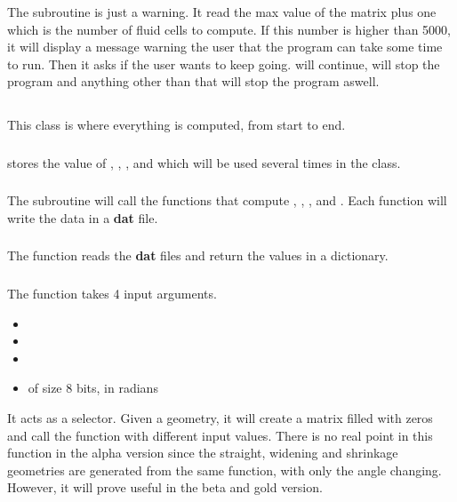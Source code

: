 \subsubsection{\textcolor{func}{}}
The subroutine \textcolor{func}{} is just a warning. It read the max value of
the matrix  plus one which is the number of fluid cells to compute.
If this number is higher than 5000, it will display a message warning the user
that the program can take some time to run. Then it asks if the user wants to
keep going.  will continue,  will stop the program and
anything other than that will stop the program aswell.

\subsection{}
This class is where everything is computed, from start to end.

\subsubsection{\textcolor{func}{}}
\textcolor{func}{} stores the value of , , ,  and
 which will be used several times in the class.

\subsubsection{\textcolor{func}{}}
The subroutine \textcolor{func}{} will call the functions that compute ,
, ,  and . Each function
will write the data in a \textbf{dat} file.

\subsubsection{\textcolor{func}{}}
The function \textcolor{func}{} reads the \textbf{dat} files and return the
values in a dictionary.

\subsubsection{\textcolor{func}{}}
The function \textcolor{func}{} takes 4 input arguments.
\begin{itemize}
      \item {}
      \item {}
      \item {}
      \item {} of size 8 bits, in radians
\end{itemize}
It acts as a selector. Given a geometry, it will create a matrix  filled
with zeros and call the function \textcolor{func}{} with different input
values. There is no real point in this function in the alpha version since the
straight, widening and shrinkage geometries are generated from the same
function, with only the angle changing. However, it will prove useful in the
beta and gold version.

